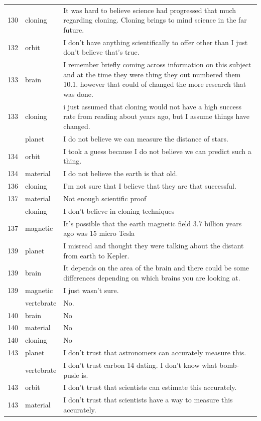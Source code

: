 \documentclass[
  doc,floatsintext]{apa6}
\begin{document}
\begin{longtable}[t]{>{}r>{}l>{\raggedright\arraybackslash}p{30em}}
130 & cloning & It was hard to believe science had progressed that much regarding cloning.  Cloning brings to mind science in the far future.\\
132 & orbit & I don't have anything scientifically to offer other than I just don't believe that's true.\\
133 & brain & I remember briefly coming across information on this subject and at the time they were thing they out numbered them 10.1. however that could of changed the more research that was done.\\
133 & cloning & i just assumed that cloning would not have a high success rate from reading about years ago, but I assume things have changed.\\
\addlinespace
134 & planet & I do not believe we can measure the distance of stars.\\
134 & orbit & I took a guess because I do not believe we can predict such a thing.\\
134 & material & I do not believe the earth is that old.\\
136 & cloning & I’m not sure that I believe that they are that successful.\\
137 & material & Not enough scientific proof\\
\addlinespace
137 & cloning & I don't believe in cloning techniques\\
137 & magnetic & It's possible that the earth magnetic field 3.7 billion years ago was 15 micro Tesla\\
139 & planet & I misread and thought they were talking about the distant from earth to Kepler.\\
139 & brain & It depends on the area of the brain and there could be some differences depending on which brains you are looking at.\\
139 & magnetic & I just wasn't sure.\\
\addlinespace
140 & vertebrate & No.\\
140 & brain & No\\
140 & material & No\\
140 & cloning & No\\
143 & planet & I don't trust that astronomers can accurately measure this.\\
\addlinespace
143 & vertebrate & I don't trust carbon 14 dating. I don't know what bomb-pusle is.\\
143 & orbit & I don't trust that scientists can estimate this accurately.\\
143 & material & I don't trust that scientists have a way to measure this accurately.\\

\end{longtable}
\end{document}
